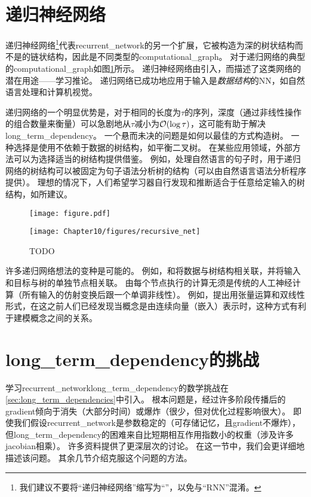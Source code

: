 \section{递归神经网络}
\label{sec:recursive_neural_networks}
递归神经网络\footnote{我们建议不要将``递归神经网络''缩写为``''，以免与``\gls{RNN}''混淆。}代表\gls{recurrent_network}的另一个扩展，它被构造为深的树状结构而不是的链状结构，因此是不同类型的\gls{computational_graph}。
对于递归网络的典型的\gls{computational_graph}如图\ref{fig:chap10_recursive_net}所示。
递归神经网络由\cite{Pollack90}引入，而\cite{tr-bottou-2011}描述了这类网络的潜在用途——学习推论。
递归网络已成功地应用于输入是\emph{数据结构}的\gls{NN}\citep{Frasconi97,Frasconi-1998}，如自然语言处理\citep{Socher+al-NIPS2011,Socher+al-EMNLP2011-small,Socher-et-al-EMNLP2013}和计算机视觉\citep{Socher-2011}。


递归网络的一个明显优势是，对于相同的长度为$\tau$的序列，深度（通过非线性操作的组合数量来衡量）可以急剧地从$\tau$减小为$\mathcal{O}(\log \tau)$，这可能有助于解决\gls{long_term_dependency}。
一个悬而未决的问题是如何以最佳的方式构造树。
一种选择是使用不依赖于数据的树结构，如平衡二叉树。
在某些应用领域，外部方法可以为选择适当的树结构提供借鉴。
例如，处理自然语言的句子时，用于递归网络的树结构可以被固定为句子语法分析树的结构（可以由自然语言语法分析程序提供）\citep{Socher+al-NIPS2011,Socher+al-EMNLP2011-small}。
理想的情况下，人们希望学习器自行发现和推断适合于任意给定输入的树结构，如\citep{tr-bottou-2011}所建议。


\begin{figure}[!htb]
\ifOpenSource
\centerline{\texttt{[image: figure.pdf]}}
\else
\centerline{\texttt{[image: Chapter10/figures/recursive\_net]}}
\fi
\caption{TODO}
\label{fig:chap10_recursive_net}
\end{figure}

许多递归网络想法的变种是可能的。
例如，\cite{Frasconi97}和\cite{Frasconi-1998}将数据与树结构相关联，并将输入和目标与树的单独节点相关联。
由每个节点执行的计算无须是传统的人工神经计算（所有输入的仿射变换后跟一个单调非线性）。
例如，\cite{Socher-et-al-EMNLP2013}提出用张量运算和双线性形式，在这之前人们已经发现当概念是由连续向量（嵌入）表示时，这种方式有利于建模概念之间的关系\citep{Weston+Bengio+Usunier-2010,Bordes-et-al-AISTATS2012-small}。

\section{\gls{long_term_dependency}的挑战}
\label{sec:the_challenge_of_long_term_dependencies}
学习\gls{recurrent_network}\gls{long_term_dependency}的数学挑战在\ref{sec:long_term_dependencies}中引入。
根本问题是，经过许多阶段传播后的\gls{gradient}倾向于消失（大部分时间）或爆炸（很少，但对优化过程影响很大）。
即使我们假设\gls{recurrent_network}是参数稳定的（可存储记忆，且\gls{gradient}不爆炸），但\gls{long_term_dependency}的困难来自比短期相互作用指数小的权重（涉及许多\gls{jacobian}相乘）。
许多资料提供了更深层次的讨论\citep{Hochreiter91-small,Doya93,Bengio1994ITNN,Pascanu+al-ICML2013-small}。
在这一节中，我们会更详细地描述该问题。
其余几节介绍克服这个问题的方法。

